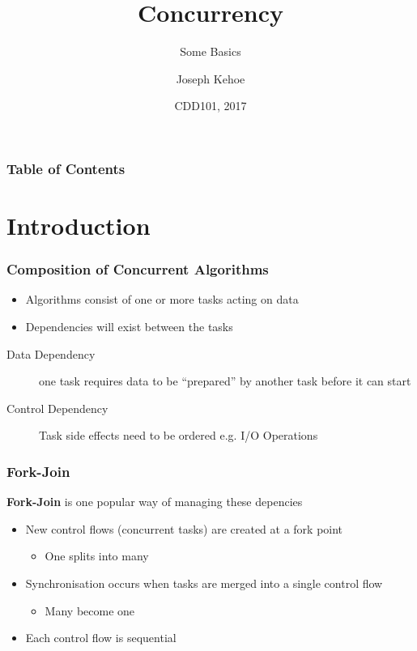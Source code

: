 \documentclass{beamer}
\title[Concurrency] %
{Concurrency}
\subtitle{Some Basics}
\author[Dr. Joseph Kehoe] %
{Joseph Kehoe\inst{1}}
\institute[IT Carlow] %
{
	\inst{1}%
	Department of Computing and Networking\\
	Institute of Technology Carlow
}
\date[ITC 2017] %
{CDD101, 2017}
\begin{document}
 
\frame{\titlepage}
 
 
 
 \begin{frame}
 	\frametitle{Table of Contents}
 	\tableofcontents
 \end{frame}
 
 
 \section{Introduction}
\begin{frame}
\frametitle{Composition of Concurrent Algorithms}

\begin{itemize}
\item Algorithms consist of one or more tasks acting on data
\item Dependencies will exist between the tasks
\end{itemize}
\begin{description}
\item[Data Dependency] one task requires data to be “prepared” by another task before it can start
\item[Control Dependency] Task side effects need to be ordered e.g. I/O Operations
\end{description}

\end{frame}

\begin{frame}
\frametitle{Fork-Join}

\textbf{Fork-Join} is one popular way of managing these depencies
\begin{itemize}
\item New control flows (concurrent tasks) are created at a fork point
\begin{itemize}
\item One splits into many
\end{itemize}
\item Synchronisation occurs when tasks are merged into a single control flow
\begin{itemize}
\item Many become one
\end{itemize}
\item Each control flow is sequential
\end{itemize}
\end{frame}
\end{document}
